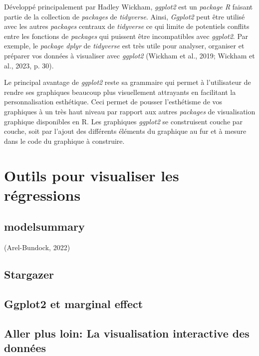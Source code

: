 \documentclass[
  letterpaper,
  DIV=11,
  numbers=noendperiod]{scrreprt}
\begin{document}
Développé principalement par Hadley Wickham, \emph{ggplot2} est un
\emph{package R} faisant partie de la collection de \emph{packages} de
\emph{tidyverse}. Ainsi, \emph{Ggplot2} peut être utilisé avec les
autres \emph{packages} centraux de \emph{tidyverse} ce qui limite de
potentiels conflits entre les fonctions de \emph{packages} qui puissent
être incompatibles avec \emph{ggplot2}. Par exemple, le \emph{package
dplyr} de \emph{tidyverse} est très utile pour analyser, organiser et
préparer vos données à visualiser avec \emph{ggplot2} (Wickham et al.,
2019; Wickham et al., 2023, p. 30).

Le principal avantage de \emph{ggplot2} reste sa grammaire qui permet à
l'utilisateur de rendre ses graphiques beaucoup plus visuellement
attrayants en facilitant la personnalisation esthétique. Ceci permet de
pousser l'esthétisme de vos graphiques à un très haut niveau par rapport
aux autres \emph{packages} de visualisation graphique disponibles en R.
Les graphiques \emph{ggplot2} se construisent couche par couche, soit
par l'ajout des différents éléments du graphique au fur et à mesure dans
le code du graphique à construire.

\section{Outils pour visualiser les
régressions}\label{outils-pour-visualiser-les-ruxe9gressions}

\subsection{modelsummary}\label{modelsummary}

(Arel-Bundock, 2022)

\subsection{Stargazer}\label{stargazer}

\subsection{Ggplot2 et marginal
effect}\label{ggplot2-et-marginal-effect}

\subsection{Aller plus loin: La visualisation interactive des
données}\label{aller-plus-loin-la-visualisation-interactive-des-donnuxe9es}
\end{document}
